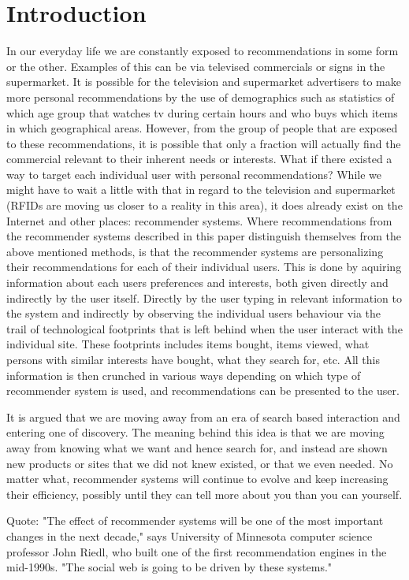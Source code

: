\section{Introduction}
In our everyday life we are constantly exposed to recommendations in some form or the other. Examples of this can be via televised commercials or signs in the supermarket.
It is possible for the television and supermarket advertisers to make more personal recommendations by the use of demographics such as statistics of which age group that watches tv during certain hours and who buys which items in which geographical areas. However, from the group of people that are exposed to these recommendations, it is possible that only a fraction will actually find the commercial relevant to their inherent needs or interests. What if there existed a way to target each individual user with personal recommendations? While we might have to wait a little with that in regard to the television and supermarket (RFIDs are moving us closer to a reality in this area), it does already exist on the Internet and other places: recommender systems.
Where recommendations from the recommender systems described in this paper distinguish themselves from the above mentioned methods, is that the recommender systems are personalizing their recommendations for each of their individual users. This is done by aquiring information about each users preferences and interests, both given directly and indirectly by the user itself. Directly by the user typing in relevant information to the system and indirectly by observing the individual users behaviour via the trail of technological footprints that is left behind when the user interact with the individual site. These footprints includes items bought, items viewed, what persons with similar interests have bought, what they search for, etc. All this information is then crunched in various ways depending on which type of recommender system is used, and recommendations can be presented to the user.

It is argued that we are moving away from an era of search based interaction and entering one of discovery. The meaning  behind this idea is that we are moving away from knowing what we want and hence search for, and instead are shown new products or sites that we did not knew existed, or that we even needed. No matter what, recommender systems will continue to evolve and keep increasing their efficiency, possibly until they can tell more about you than you can yourself.



Quote:
"The effect of recommender systems will be one of the most important changes in the next decade," says University of Minnesota computer science professor John Riedl, who built one of the first recommendation engines in the mid-1990s. "The social web is going to be driven by these systems."